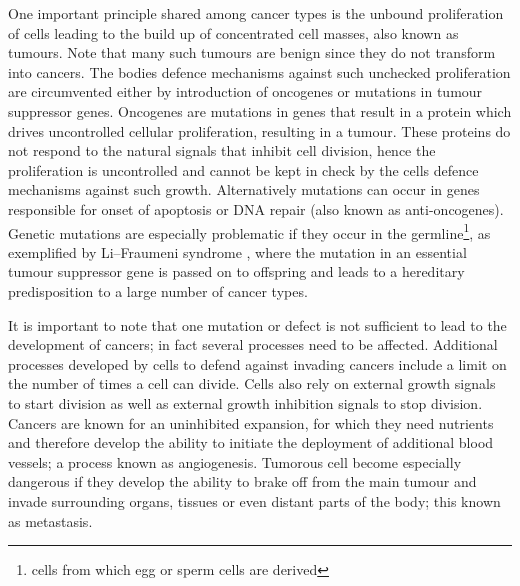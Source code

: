 One important principle shared among cancer types is the unbound proliferation of cells leading to the build up of concentrated cell masses, also known as tumours. Note that many such tumours are benign since they do not transform into cancers. The bodies defence mechanisms against such unchecked proliferation are circumvented either by introduction of oncogenes or mutations in tumour suppressor genes. Oncogenes are mutations in genes that result in a protein which drives uncontrolled cellular proliferation, resulting in a tumour. These proteins do not respond to the natural signals that inhibit cell division, hence the proliferation is uncontrolled and cannot be kept in check by the cells defence mechanisms against such growth. Alternatively mutations can occur in genes responsible for onset of apoptosis or DNA repair (also known as anti-oncogenes). Genetic mutations are especially problematic if they occur in the germline\footnote{cells from which egg or sperm cells are derived}, as exemplified by Li–Fraumeni syndrome \citep{Li:1969kl}, where the mutation in an essential tumour suppressor gene is passed on to offspring and leads to a hereditary predisposition to a large number of cancer types.

It is important to note that one mutation or defect is not sufficient to lead to the development of cancers; in fact several processes need to be affected. Additional processes developed by cells to defend against invading cancers include a limit on the number of times a cell can divide. Cells also rely on external growth signals to start division as well as external growth inhibition signals to stop division. Cancers are known for an uninhibited expansion, for which they need nutrients and therefore develop the ability to initiate the deployment of additional blood vessels; a process known as angiogenesis. Tumorous cell become especially dangerous if they develop the ability to brake off from the main tumour and invade surrounding organs, tissues or even distant parts of the body; this known as metastasis.

